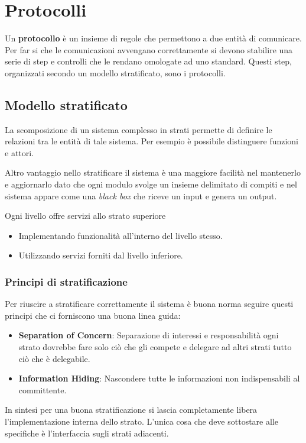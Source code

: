 \section{Protocolli}
Un \textbf{protocollo} è un insieme di regole che permettono a due entità di comunicare. Per far 
si che le comunicazioni avvengano correttamente si devono stabilire una serie di step e controlli 
che le rendano omologate ad uno standard. Questi step, organizzati secondo un modello stratificato,
sono i protocolli.

\subsection{Modello stratificato}
La scomposizione di un sistema complesso in strati permette di definire le relazioni tra le entità
di tale sistema. Per esempio è possibile distinguere funzioni e attori.

Altro vantaggio nello stratificare il sistema è una maggiore facilità nel mantenerlo e aggiornarlo
dato che ogni modulo svolge un insieme delimitato di compiti e nel sistema appare come una 
\emph{black box} che riceve un input e genera un output.

Ogni livello offre servizi allo strato superiore
\begin{itemize}
	\item Implementando funzionalità all'interno del livello stesso.
	\item Utilizzando servizi forniti dal livello inferiore.
\end{itemize}

\subsubsection{Principi di stratificazione}
Per riuscire a stratificare correttamente il sistema è buona norma seguire questi principi che 
ci forniscono una buona linea guida:
\begin{itemize}
	\item \textbf{Separation of Concern}: Separazione di interessi e responsabilità ogni strato
		dovrebbe fare solo ciò che gli compete e delegare ad altri strati tutto ciò che è
		delegabile.
	\item \textbf{Information Hiding}: Nascondere tutte le informazioni non indispensabili al 
		committente.
\end{itemize}
In sintesi per una buona stratificazione si lascia completamente libera l'implementazione interna
dello strato. L'unica cosa che deve sottostare alle specifiche è l'interfaccia sugli strati
adiacenti.

